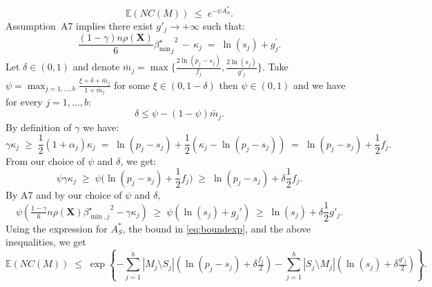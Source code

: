 \documentclass[aos]{imsart}
\theoremstyle{plain}
\newcommand{\E}{\mathbb{E}}
\newcommand{\bs}{\boldsymbol}
\begin{document}
\begin{equation}\label{eq:boundexp}
    \E(NC(M))\;\leq\;e^{-\psi A_S^*}.
\end{equation}
Assumption~A7 implies there exist $g'_j \to +\infty$ such that:
$$\frac{(1-\gamma) n\rho(\bs X)}{6}{{\beta_{\min}^{\star}}_j}^2 \,- \,\kappa_j \;=\; \ln(s_j) + g^{\prime}_{j}.$$
Let $\delta \in (0,1)$ and denote $\bar{m}_j=\max\big\{\frac{2\ln(p_j-s_j)}{f_j},\frac{2\ln(s_j)}{g'_{j}}\big\}$. Take $\psi=\max_{j=1,\ldots,b}\frac{\xi + \delta + \bar{m}_j}{1+\bar{m}_j}$ for some $\xi \in(0, 1- \delta)$ then $\psi \in (0,1)$ and we have for every $j=1,\ldots,b$:
$$\delta \leq \psi-(1-\psi)\bar{m}_j.$$ 
By definition of $\gamma$ we have: 
$$
\gamma\kappa_j\;\geq\;\frac12 (1+\alpha_j)\kappa_j\;=\;\ln(p_j-s_j)+\frac12(\kappa_j-\ln(p_j-s_j)) \;=\; \ln(p_j-s_j)+ \frac12f_j.
$$
From our choice of $\psi$ and $\delta$, we get:
$$\psi\gamma\kappa_j \;\geq\; \psi\big(\ln(p_j-s_j)+ \frac12f_j\big) \;\geq\;  \ln(p_j-s_j)+ \delta\frac12f_j.$$
By A7 and by our choice of $\psi$ and $\delta$,
$$\psi\left(\tfrac{1-\gamma}{6} n \rho(\bs X) {\beta^{\star}_{\min,j}}^{2} - \gamma\kappa_j\right) \;\geq\; \psi\left(\ln(s_j)+g_j'\right) \;\geq\; \ln(s_j)+\delta \frac{1}{2}g'_j.
$$
Using the expression for $A_S^*$, the bound in \eqref{eq:boundexp}, and the above inequalities, we get
$$
\E(NC(M))\;\leq\;\exp\left\{- \sum_{j=1}^b |M_j\setminus S_j|(\ln(p_j-s_j)+\delta \tfrac{f_j}{2})-\sum_{j=1}^b |S_j\setminus M_j|(\ln(s_j)+\delta \tfrac{g'_j}{2})\right\}.
$$
\end{document}
